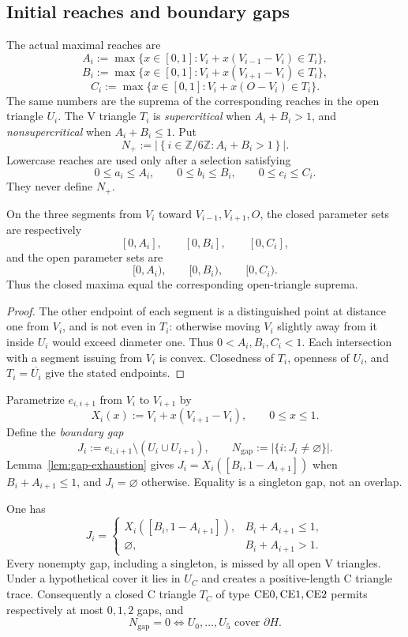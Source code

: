 \subsection{Initial reaches and boundary gaps}

The actual maximal reaches are
\[
 A_i:=\max\{x\in[0,1]:V_i+x(V_{i-1}-V_i)\in T_i\},
\]
\[
 B_i:=\max\{x\in[0,1]:V_i+x(V_{i+1}-V_i)\in T_i\},
\]
\[
 C_i:=\max\{x\in[0,1]:V_i+x(O-V_i)\in T_i\}.
\]
The same numbers are the suprema of the corresponding reaches in the open
triangle $U_i$. The V triangle $T_i$ is \emph{supercritical} when
$A_i+B_i>1$, and \emph{nonsupercritical} when $A_i+B_i\le1$. Put
\begin{equation}
 N_+:=\left\lvert\left\{i\in\mathbb Z/6\mathbb Z:
 A_i+B_i>1\right\}\right\rvert.
 \label{eq:N-plus-definition}
\end{equation}
Lowercase reaches are used only after a selection satisfying
\[
 0\le a_i\le A_i,\qquad 0\le b_i\le B_i,\qquad 0\le c_i\le C_i.
\]
They never define $N_+$.

\begin{lemma}
\label{lem:reach-initial-segments}
On the three segments from $V_i$ toward $V_{i-1},V_{i+1},O$, the closed
parameter sets are respectively
\[
 [0,A_i],\qquad[0,B_i],\qquad[0,C_i],
\]
and the open parameter sets are
\[
 [0,A_i),\qquad[0,B_i),\qquad[0,C_i).
\]
Thus the closed maxima equal the corresponding open-triangle suprema.
\end{lemma}

\begin{proof}
The other endpoint of each segment is a distinguished point at distance
one from $V_i$, and is not even in $T_i$: otherwise moving $V_i$
slightly away from it inside $U_i$ would exceed diameter one.
Thus $0<A_i,B_i,C_i<1$. Each intersection with a segment issuing from
$V_i$ is convex.  Closedness of $T_i$, openness of $U_i$, and
$T_i=\overline{U_i}$ give the stated endpoints.
\end{proof}

Parametrize $e_{i,i+1}$ from $V_i$ to $V_{i+1}$ by
\[
 X_i(x):=V_i+x(V_{i+1}-V_i),\qquad 0\le x\le1.
\]
Define the \emph{boundary gap}
\[
 J_i:=e_{i,i+1}\setminus(U_i\cup U_{i+1}),\qquad
 N_{\mathrm{gap}}:=|\{i:J_i\ne\varnothing\}|.
\]
Lemma~\ref{lem:gap-exhaustion} gives
$J_i=X_i([B_i,1-A_{i+1}])$ when $B_i+A_{i+1}\le1$, and $J_i=\varnothing$
otherwise. Equality is a singleton gap, not an overlap.

\begin{lemma}
\label{lem:gap-exhaustion}
One has
\[
 J_i=\begin{cases}
 X_i([B_i,1-A_{i+1}]),&B_i+A_{i+1}\le1,\\
 \varnothing,&B_i+A_{i+1}>1.
 \end{cases}
\]
Every nonempty gap, including a singleton, is missed by all open V triangles.
Under a hypothetical cover it lies in $U_C$ and creates a positive-length
C triangle trace.
Consequently a closed C triangle $T_C$ of type
$\mathrm{CE0},\mathrm{CE1},\mathrm{CE2}$ permits respectively at most $0,1,2$ gaps, and
\[
 N_{\mathrm{gap}}=0
 \iff U_0,\ldots,U_5\text{ cover }\partial H.
\]
\end{lemma}


